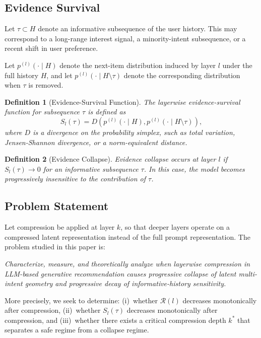 \documentclass[lettersize,journal]{IEEEtran}
\newtheorem{definition}{Definition}
\begin{document}
\subsection{Evidence Survival}
Let $\tau \subset H$ denote an informative subsequence of the user history. This may correspond to a long-range interest signal, a minority-intent subsequence, or a recent shift in user preference.

Let $p^{(l)}(\cdot \mid H)$ denote the next-item distribution induced by layer $l$ under the full history $H$, and let $p^{(l)}(\cdot \mid H \setminus \tau)$ denote the corresponding distribution when $\tau$ is removed.

\begin{definition}[Evidence-Survival Function]
The layerwise evidence-survival function for subsequence $\tau$ is defined as
\begin{equation}
S_l(\tau)
=
D\!\left(
p^{(l)}(\cdot \mid H),
p^{(l)}(\cdot \mid H \setminus \tau)
\right),
\end{equation}
where $D$ is a divergence on the probability simplex, such as total variation, Jensen-Shannon divergence, or a norm-equivalent distance.
\end{definition}

\begin{definition}[Evidence Collapse]
Evidence collapse occurs at layer $l$ if $S_l(\tau) \to 0$ for an informative subsequence $\tau$. In this case, the model becomes progressively insensitive to the contribution of $\tau$.
\end{definition}

\subsection{Problem Statement}
Let compression be applied at layer $k$, so that deeper layers operate on a compressed latent representation instead of the full prompt representation. The problem studied in this paper is:

\emph{Characterize, measure, and theoretically analyze when layerwise compression in LLM-based generative recommendation causes progressive collapse of latent multi-intent geometry and progressive decay of informative-history sensitivity.}

More precisely, we seek to determine: (i)~whether $\mathcal{R}(l)$ decreases monotonically after compression, (ii)~whether $S_l(\tau)$ decreases monotonically after compression, and (iii)~whether there exists a critical compression depth $k^*$ that separates a safe regime from a collapse regime.
\end{document}
